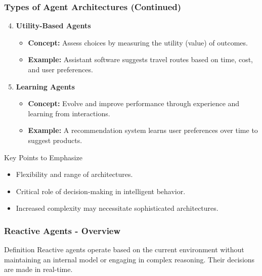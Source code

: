 \documentclass[aspectratio=169]{beamer}
\begin{document}
\begin{frame}[fragile]
    \frametitle{Types of Agent Architectures (Continued)}
    \begin{enumerate}
        \setcounter{enumi}{3} %
        \item \textbf{Utility-Based Agents}
        \begin{itemize}
            \item \textbf{Concept:} Assess choices by measuring the utility (value) of outcomes.
            \item \textbf{Example:} Assistant software suggests travel routes based on time, cost, and user preferences.
        \end{itemize}
        
        \item \textbf{Learning Agents}
        \begin{itemize}
            \item \textbf{Concept:} Evolve and improve performance through experience and learning from interactions.
            \item \textbf{Example:} A recommendation system learns user preferences over time to suggest products.
        \end{itemize}
    \end{enumerate}

    \begin{block}{Key Points to Emphasize}
        \begin{itemize}
            \item Flexibility and range of architectures.
            \item Critical role of decision-making in intelligent behavior.
            \item Increased complexity may necessitate sophisticated architectures.
        \end{itemize}
    \end{block}
\end{frame}

\begin{frame}[fragile]
    \frametitle{Reactive Agents - Overview}
    \begin{block}{Definition}
        Reactive agents operate based on the current environment without maintaining an internal model or engaging in complex reasoning. Their decisions are made in real-time.
    \end{block}
\end{frame}
\end{document}
